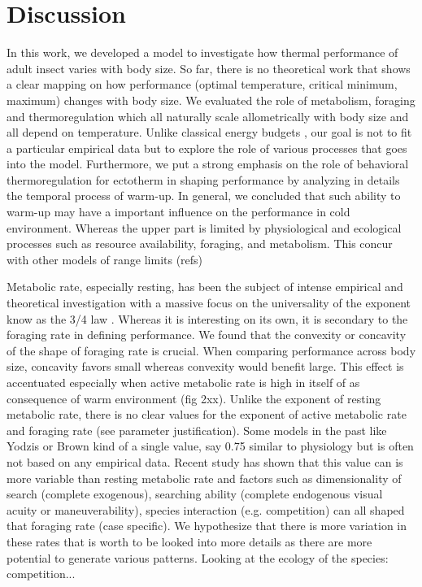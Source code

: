 \section*{Discussion}
In this work, we developed a model to investigate how thermal performance of adult insect varies with body size.
So far, there is no theoretical work that shows a clear mapping on how performance (optimal temperature, critical minimum, maximum) changes with body size. 
We evaluated the role of metabolism, foraging and thermoregulation which all naturally scale allometrically with body size and all depend on temperature.
Unlike classical energy budgets \citep[e.g.,][]{Kooijman2009}, our goal is not to fit a particular empirical data but to explore the role of various processes that goes into the model.
Furthermore, we put a strong emphasis on the role of behavioral thermoregulation for ectotherm in shaping performance by analyzing in details the temporal process of warm-up.
In general, we concluded that such ability to warm-up may have a important influence on the performance in cold environment.
Whereas the upper part is limited by physiological and ecological processes such as resource availability, foraging, and metabolism.
This concur with other models of range limits (refs)%

Metabolic rate, especially resting, has been the subject of intense empirical and theoretical investigation with a massive focus on  the universality of the exponent know as the 3/4 law \citep{Peters1986,West1997, Kozlowski1997, Brown2004, Isaac2010}. 
 Whereas it is interesting on its own, it is secondary to the foraging rate in defining performance.
We found that the convexity or concavity of the shape of foraging rate is crucial.
When comparing performance across body size, concavity favors small whereas convexity would benefit large.
This effect is accentuated especially when active metabolic rate is high in itself of as consequence of warm environment (fig 2xx).
Unlike the exponent of resting metabolic rate, there is no clear values for the exponent of active metabolic rate and foraging rate (see parameter justification).
Some models in the past like Yodzis or Brown kind of a single value, say 0.75 similar to physiology but is often not based on any empirical data.
Recent study has shown that this value can is more variable than resting metabolic rate and factors such as dimensionality of search (complete exogenous), searching ability (complete endogenous visual acuity or maneuverability),  species interaction (e.g. competition) can all shaped that foraging rate (case specific).
We hypothesize that there is more variation in these rates that is worth to be looked into more details as there are more potential to generate various patterns.
Looking at the ecology of the species: competition...%

